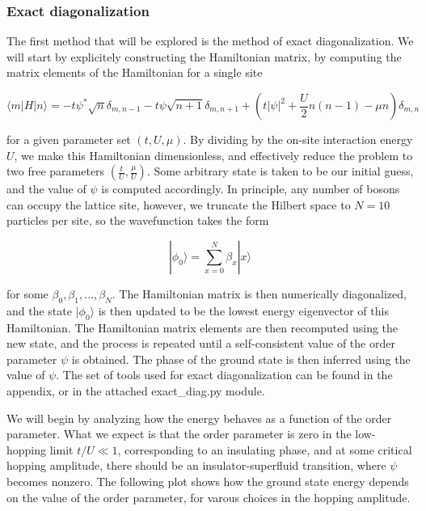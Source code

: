\documentclass[11pt]{article}
\begin{document}
    \hypertarget{exact-diagonalization}{%
\subsubsection{Exact diagonalization}\label{exact-diagonalization}}

    The first method that will be explored is the method of exact
diagonalization. We will start by explicitely constructing the
Hamiltonian matrix, by computing the matrix elements of the Hamiltonian
for a single site

\[\langle m | H | n \rangle = -t \psi^* \sqrt{n} \delta_{m,n-1} - t\psi \sqrt{n+1} \delta_{m,n+1} + \left(t |\psi|^2 + \frac{U}{2} n(n-1) - \mu n\right) \delta_{m,n}\]

for a given parameter set \((t,U,\mu)\). By dividing by the on-site
interaction energy \(U\), we make this Hamiltonian dimensionless, and
effectively reduce the problem to two free parameters
\(\left( \frac{t}{U},\frac{\mu}{U} \right)\). Some arbitrary state is
taken to be our initial guess, and the value of \(\psi\) is computed
accordingly. In principle, any number of bosons can occupy the lattice
site, however, we truncate the Hilbert space to \(N=10\) particles per
site, so the wavefunction takes the form

\[| \phi_0 \rangle = \sum_{x=0}^N \beta_x | x \rangle \]

for some \(\beta_0,\beta_1,\ldots,\beta_N\). The Hamiltonian matrix is
then numerically diagonalized, and the state \(| \phi_0 \rangle\) is
then updated to be the lowest energy eigenvector of this Hamiltonian.
The Hamiltonian matrix elements are then recomputed using the new state,
and the process is repeated until a self-consistent value of the order
parameter \(\psi\) is obtained. The phase of the ground state is then
inferred using the value of \(\psi\). The set of tools used for exact
diagonalization can be found in the appendix, or in the attached
exact\_diag.py module.

We will begin by analyzing how the energy behaves as a function of the
order parameter. What we expect is that the order parameter is zero in
the low-hopping limit \(t/U \ll 1\), corresponding to an insulating
phase, and at some critical hopping amplitude, there should be an
insulator-superfluid transition, where \(\psi\) becomes nonzero. The
following plot shows how the ground state energy depends on the value of
the order parameter, for varous choices in the hopping amplitude.
\end{document}
